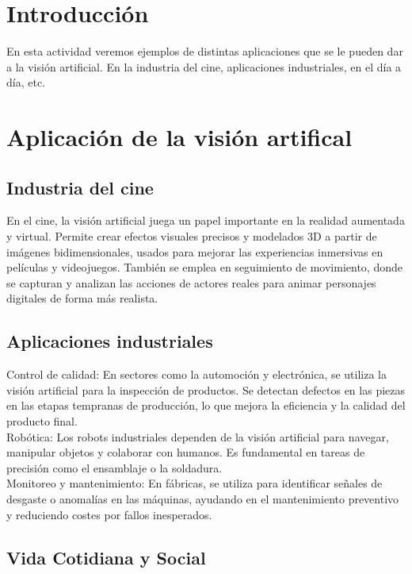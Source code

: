 \documentclass[12pt]{article}
\begin{document}
\section{Introducción}
En esta actividad veremos ejemplos de distintas aplicaciones que se le pueden dar a la visión artificial. En la industria del cine, aplicaciones industriales, en el día a día, etc.

\section{Aplicación de la visión artifical}

\subsection{Industria del cine}

En el cine, la visión artificial juega un papel importante en la realidad aumentada y virtual. Permite crear efectos visuales precisos y modelados 3D a partir de imágenes bidimensionales, 
usados para mejorar las experiencias inmersivas en películas y videojuegos. También se emplea en seguimiento de movimiento, 
donde se capturan y analizan las acciones de actores reales para animar personajes digitales de forma más realista.

\subsection{Aplicaciones industriales}

Control de calidad: En sectores como la automoción y electrónica, se utiliza la visión artificial para la inspección de productos. 
Se detectan defectos en las piezas en las etapas tempranas de producción, lo que mejora la eficiencia y la calidad del producto final.
\\
Robótica: Los robots industriales dependen de la visión artificial para navegar, manipular objetos y colaborar con humanos. 
Es fundamental en tareas de precisión como el ensamblaje o la soldadura.
\\
Monitoreo y mantenimiento: En fábricas, se utiliza para identificar señales de desgaste o anomalías en las máquinas, ayudando en el mantenimiento preventivo y reduciendo
costes por fallos inesperados.

\subsection{Vida Cotidiana y Social}
\end{document}
